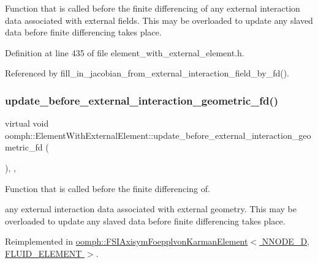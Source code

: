 Function that is called before the finite differencing of any external interaction data associated with external fields. This may be overloaded to update any slaved data before finite differencing takes place. 



Definition at line 435 of file element\+\_\+with\+\_\+external\+\_\+element.\+h.



Referenced by fill\+\_\+in\+\_\+jacobian\+\_\+from\+\_\+external\+\_\+interaction\+\_\+field\+\_\+by\+\_\+fd().

\mbox{\label{classoomph_1_1ElementWithExternalElement_a2460f9def76ae512936eba0a1010cdc2}} 
\subsubsection{\texorpdfstring{update\+\_\+before\+\_\+external\+\_\+interaction\+\_\+geometric\+\_\+fd()}{update\_before\_external\_interaction\_geometric\_fd()}}
{\footnotesize\ttfamily virtual void oomph\+::\+Element\+With\+External\+Element\+::update\+\_\+before\+\_\+external\+\_\+interaction\+\_\+geometric\+\_\+fd (\begin{DoxyParamCaption}{ }\end{DoxyParamCaption})\hspace{0.3cm}{\ttfamily [inline]}, {\ttfamily [protected]}, {\ttfamily [virtual]}}



Function that is called before the finite differencing of. 

any external interaction data associated with external geometry. This may be overloaded to update any slaved data before finite differencing takes place. 

Reimplemented in \hyperlink{classoomph_1_1FSIAxisymFoepplvonKarmanElement_a4ab5ac225a4ecbd709e8bb5ce752f939}{oomph\+::\+F\+S\+I\+Axisym\+Foepplvon\+Karman\+Element$<$ N\+N\+O\+D\+E\+\_\+D, F\+L\+U\+I\+D\+\_\+\+E\+L\+E\+M\+E\+N\+T $>$}.



